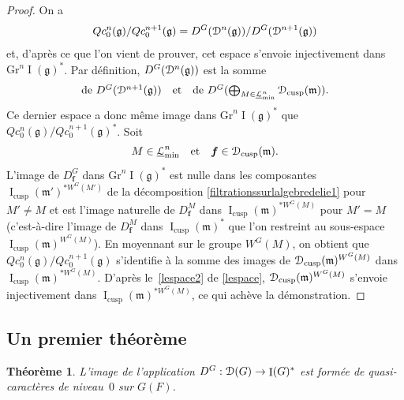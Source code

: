 \documentclass[11pt]{article}
\newcommand{\Subsection}{\subsection}
\numberwithin{equation}{section}\providecommand{\og}{«\,}\providecommand{\fg}{\,»}
\let\mathcal \EuScript
\newcommand{\quadet}{\quad\text{et}\quad}
\newcommand{\frg}{\mathfrak{g}}
\newcommand{\mfrm}{\mathfrak{m}}
\newcommand{\cusp}{\mathrm{cusp}}
\newcommand{\Gr}{\mathrm{Gr}}
\DeclareMathOperator{\rI}{I}
\newcommand{\bmf}{\boldsymbol{f}}
\newcommand{\cD}{\mathcal{D}}
\newcommand{\cL}{\mathcal{L}}
\theoremstyle{plain}
\newtheorem*{thm*}{Théorème}
\theoremstyle{definition}
\begin{document}
\begin{proof}
On a
\[
Qc_{0}^n(\frg)/Qc_{0}^{n+1}(\frg)=D^G(\cD^n(\frg))/D^G(\cD^{n+1}(\frg))
\]
et, d'après ce que l'on vient de prouver, cet espace s'envoie injectivement dans $\Gr^n\rI(\frg)^*$.
Par définition, $D^G(\cD^n(\frg))$ est la somme
\[\textstyle
\text{de }D^G(\cD^{n+1}(\frg))\quadet \text{de }D^G(\bigoplus_{M\in \underline{\cL}_{\min}^n}\cD_{\cusp}(\mfrm)).
\]
Ce dernier espace a donc même image dans $\Gr^n\rI(\frg)^*$ que $Qc_{0}^n(\frg)/Qc_{0}^{n+1}(\frg)^*$. Soit
\[
M\in \underline{\cL}_{\min}^n\quadet \bmf\in \cD_{\cusp}(\mfrm).
\]
L'image de $D^G_{\bmf}$ dans $\Gr^n\rI(\frg)^*$ est nulle dans les composantes $\rI_{\cusp}(\mfrm')^{*W^G(M')}$ de la décomposition \eqref{filtrationssurlalgebredelie1} pour $M'\neq M$ et est l'image naturelle de $D^M_{\bmf}$ dans $\rI_{\cusp}(\mfrm)^{* W^G(M)}$ pour $M'=M$ (c'est-à-dire l'image de $D^M_{\bmf}$ dans $\rI_{\cusp}(\mfrm)^*$ que l'on restreint au sous-espace $\rI_{\cusp}(\mfrm)^{W^G(M)}$). En moyennant sur le groupe $ W^G(M)$, on obtient que $Qc_{0}^n(\frg)/Qc_{0}^{n+1}(\frg)$ s'identifie à la somme des images de $\cD_{\cusp}(\mfrm)^{W^G(M)}$ dans $\rI_{\cusp}(\mfrm)^{*W^G(M)}$.
D'après le~\eqref{lespace2} de \ref{lespace}, $\cD_{\cusp}(\mfrm)^{W^G(M)}$ s'envoie injectivement dans $\rI_{\cusp}(\mfrm)^{*W^G(M)}$, ce qui achève la démonstration.
\end{proof}

\Subsection{ Un premier théorème}\label{unpremiertheoreme}

\begin{thm*}
L'image de l'application $D^G:\cD(G)\to \rI(G)^*$ est formée de quasi-caractères de niveau~$0$ sur $G(F)$.
\end{thm*}
\end{document}

